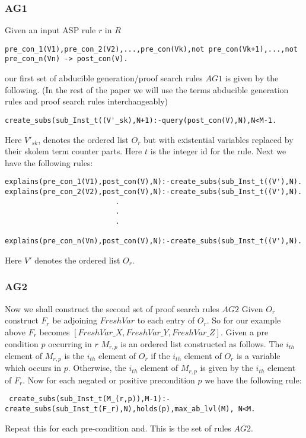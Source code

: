\documentclass{article}
\begin{document}
\subsubsection{AG1}
Given an input ASP rule $r$ in $R$
\begin{verbatim}
pre_con_1(V1),pre_con_2(V2),...,pre_con(Vk),not pre_con(Vk+1),...,not pre_con_n(Vn) -> post_con(V).
\end{verbatim}
our first set of abducible generation/proof search rules $AG1$ is given by the following. (In the rest of the paper we will use the terms abducible generation rules and proof search rules interchangeably) 
\begin{verbatim}
create_subs(sub_Inst_t((V'_sk),N+1):-query(post_con(V),N),N<M-1.
\end{verbatim}
Here $V'_{sk}$, denotes the ordered list $O_{r}$ but with existential variables replaced by their skolem term counter parts. Here $t$ is the integer id for the rule.
Next we have the following rules:
\begin{verbatim}
explains(pre_con_1(V1),post_con(V),N):-create_subs(sub_Inst_t((V'),N).
explains(pre_con_2(V2),post_con(V),N):-create_subs(sub_Inst_t((V'),N).
                          .
                          .
                          .
                        
explains(pre_con_n(Vn),post_con(V),N):-create_subs(sub_Inst_t((V'),N).
\end{verbatim}
Here $V'$ denotes the ordered list $O_{r}$. \\
\newline
\subsubsection{AG2}
Now we shall construct the second set of proof search rules $AG2$ Given $O_{r}$ construct $F_{r}$ be adjoining $FreshVar$ to each entry of $O_{r}$. So for our example above $F_{r}$ becomes $[FreshVar\_X,FreshVar\_Y,FreshVar\_Z]$. Given a pre condition $p$ occurring in $r$ $M_{r,p}$ is an ordered list constructed as follows. The $i_{th}$ element of $M_{r,p}$ is the $i_{th}$ element of $O_{r}$ if the $i_{th}$ element of $O_{r}$ is a variable which occurs in $p$. Otherwise, the $i_{th}$ element of $M_{r,p}$ is given by the $i_{th}$ element of $F_{r}$. Now for each negated or positive precondition $p$ we have the following rule:
\begin{verbatim}
 create_subs(sub_Inst_t(M_(r,p)),M-1):-create_subs(sub_Inst_t(F_r),N),holds(p),max_ab_lvl(M), N<M.   
\end{verbatim}
Repeat this for each pre-condition and. This is the set of rules $AG2$. \\
\newline
\end{document}
